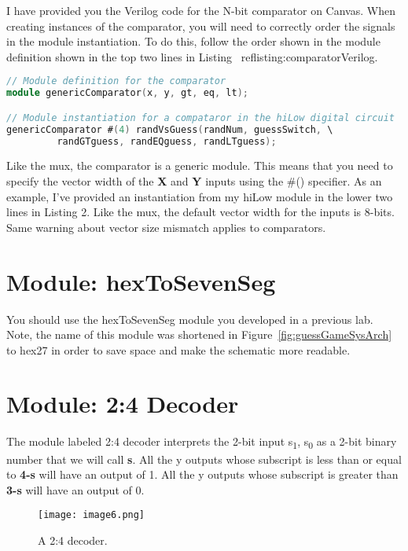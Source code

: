 I have provided you the Verilog code for the N-bit comparator on Canvas.
When creating instances of the comparator, you will need to correctly
order the signals in the module instantiation. To do this, follow the
order shown in the module definition shown in the top two lines in
Listing ~ref{listing:comparatorVerilog}.

\begin{lstlisting}[language=Verilog,
 caption={Top, the module definition for the comparator.  Bottom, module
 instantiation of a comparator in Figure~\ref{fig:comparatorSymbol}.},
 label={listing:comparatorVerilog},
 frame=single]
// Module definition for the comparator
module genericComparator(x, y, gt, eq, lt);

// Module instantiation for a compataror in the hiLow digital circuit
genericComparator #(4) randVsGuess(randNum, guessSwitch, \
		 randGTguess, randEQguess, randLTguess);
\end{lstlisting}

Like the mux, the comparator is a generic module. This means that you
need to specify the vector width of the \textbf{X} and \textbf{Y} inputs
using the \#() specifier. As an example, I've provided an instantiation
from my hiLow module in the lower two lines in Listing 2. Like the mux,
the default vector width for the inputs is 8-bits. Same warning about
vector size mismatch applies to comparators.


\section{Module: hexToSevenSeg}
You should use the hexToSevenSeg module you developed in a
previous lab. Note, the name of this module was shortened in Figure~\ref{fig:guessGameSysArch}
to
hex27 in order to save space and make the schematic more
readable.


\section{Module: 2:4 Decoder}


The module labeled 2:4 decoder interprets the 2-bit input
s\textsubscript{1}, s\textsubscript{0} as a 2-bit binary number that we
will call \textbf{s}. All the y outputs whose subscript is less than or
equal to \textbf{4-s} will have an output of 1. All the y outputs whose
subscript is greater than \textbf{3-s} will have an output of 0.

\begin{figure}[ht]
\texttt{[image: image6.png]}
\caption{A 2:4 decoder.}
\label{fig:2x4decoderSymbol}
\end{figure}

